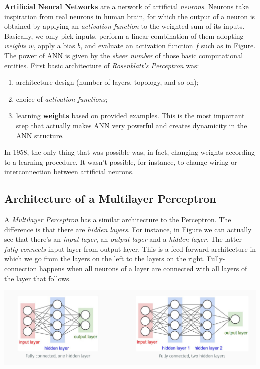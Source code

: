 \documentclass[10pt]{report}
\begin{document}
\textbf{Artificial Neural Networks} are a network of artificial \emph{neurons}.
Neurons take inspiration from real neurons in human brain, for which the
output of a neuron is obtained by applying an \emph{activation function} to
the weighted sum of its inputs. Basically, we only pick inputs, perform
a linear combination of them adopting \emph{weights} \(w\), apply a bias
\(b\), and evaluate an activation function \(f\) such as in Figure. The
power of ANN is given by the \emph{sheer number} of those basic computational
entities. First basic architecture of \emph{Rosenblatt's Perceptron} was:

\begin{enumerate}
\item architecture design (number of layers, topology, and so on);
\item choice of \emph{activation functions};
\item learning \textbf{weights} based on provided examples. This is the most
important step that actually makes ANN very powerful and creates
dynamicity in the ANN structure.
\end{enumerate}

In 1958, the only thing that was possible was, in fact, changing weights
according to a learning procedure. It wasn't possible, for instance, to
change wiring or interconnection between artificial neurons.

\subsection{Architecture of a Multilayer Perceptron}
\label{sec:org9042fa9}
A \emph{Multilayer Perceptron} has a similar architecture to the Perceptron.
The difference is that there are \emph{hidden layers}. For instance, in
Figure we can actually see that there's an \emph{input layer}, an \emph{output
layer} and a \emph{hidden layer}. The latter \emph{fully-connects} input layer
from output layer. This is a feed-forward architecture in which we go
from the layers on the left to the layers on the right. Fully-connection
happens when all neurons of a layer are connected with all layers of the
layer that follows.

\begin{center}
\includegraphics[width=.9\linewidth]{./pics/cnn/multilayer-perceptron.jpg}
\end{center}
\end{document}
